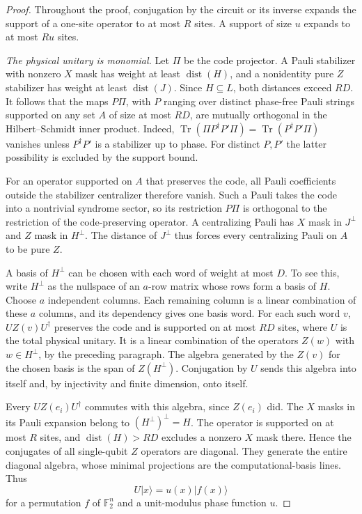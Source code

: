 \documentclass[aps,prl,reprint,notitlepage,nofootinbib,nobibnotes]{revtex4-2}
\begin{document}
\begin{proof}
Throughout the proof, conjugation by the circuit or its inverse expands the support of a one-site operator to at most \(R\) sites. A support of size \(u\) expands to at most \(Ru\) sites.

\emph{The physical unitary is monomial.}
Let \(\Pi\) be the code projector. A Pauli stabilizer with nonzero \(X\) mask has weight at least \(\operatorname{dist}(H)\), and a nonidentity pure \(Z\) stabilizer has weight at least \(\operatorname{dist}(J)\). Since \(H\subseteq L\), both distances exceed \(RD\). It follows that the maps \(P\Pi\), with \(P\) ranging over distinct phase-free Pauli strings supported on any set \(A\) of size at most \(RD\), are mutually orthogonal in the Hilbert--Schmidt inner product. Indeed, \(\operatorname{Tr}(\Pi P^\dagger P'\Pi)=\operatorname{Tr}(P^\dagger P'\Pi)\) vanishes unless \(P^\dagger P'\) is a stabilizer up to phase. For distinct \(P,P'\) the latter possibility is excluded by the support bound.

For an operator supported on \(A\) that preserves the code, all Pauli coefficients outside the stabilizer centralizer therefore vanish. Such a Pauli takes the code into a nontrivial syndrome sector, so its restriction \(P\Pi\) is orthogonal to the restriction of the code-preserving operator. A centralizing Pauli has \(X\) mask in \(J^\perp\) and \(Z\) mask in \(H^\perp\). The distance of \(J^\perp\) thus forces every centralizing Pauli on \(A\) to be pure \(Z\).

A basis of \(H^\perp\) can be chosen with each word of weight at most \(D\). To see this, write \(H^\perp\) as the nullspace of an \(a\)-row matrix whose rows form a basis of \(H\). Choose \(a\) independent columns. Each remaining column is a linear combination of these \(a\) columns, and its dependency gives one basis word. For each such word \(v\), \(UZ(v)U^\dagger\) preserves the code and is supported on at most \(RD\) sites, where \(U\) is the total physical unitary. It is a linear combination of the operators \(Z(w)\) with \(w\in H^\perp\), by the preceding paragraph. The algebra generated by the \(Z(v)\) for the chosen basis is the span of \(Z(H^\perp)\). Conjugation by \(U\) sends this algebra into itself and, by injectivity and finite dimension, onto itself.

Every \(UZ(e_i)U^\dagger\) commutes with this algebra, since \(Z(e_i)\) did. The \(X\) masks in its Pauli expansion belong to \((H^\perp)^\perp=H\). The operator is supported on at most \(R\) sites, and \(\operatorname{dist}(H)>RD\) excludes a nonzero \(X\) mask there. Hence the conjugates of all single-qubit \(Z\) operators are diagonal. They generate the entire diagonal algebra, whose minimal projections are the computational-basis lines. Thus
\begin{equation}\label{em:upper-monomial}
 U|x\rangle=u(x)|f(x)\rangle
\end{equation}
for a permutation \(f\) of \(\mathbb F_2^n\) and a unit-modulus phase function \(u\).


\end{proof}
\end{document}
